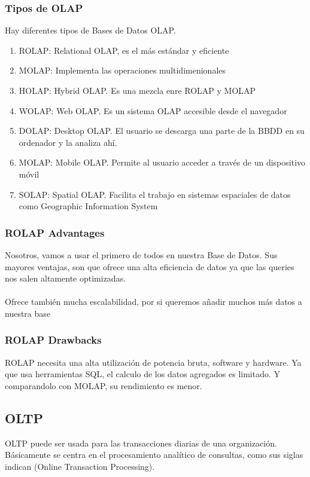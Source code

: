 \documentclass[a4paper 
,twoside
]{article}
\begin{document}
    \subsubsection{Tipos de OLAP}
    Hay diferentes tipos de Bases de Datos OLAP.
    \begin{enumerate}
      \item ROLAP: Relational OLAP, es el más estándar y eficiente
      \item MOLAP: Implementa las operaciones multidimenionales
      \item HOLAP: Hybrid OLAP. Es una mezcla enre ROLAP y MOLAP
      \item WOLAP: Web OLAP. Es un sistema OLAP accesible desde el navegador
      \item DOLAP: Desktop OLAP. El usuario se descarga una parte de la BBDD en su ordenador y la analiza ahí.
      \item MOLAP: Mobile OLAP. Permite al usuario acceder a través de un dispositivo móvil
      \item SOLAP: Spatial OLAP. Facilita el trabajo en sistemas espaciales de datos como Geographic Information System
    \end{enumerate}

    \subsubsection{ROLAP Advantages}
    Nosotros, vamos a usar el primero de todos en nuestra Base de Datos. Sus mayores ventajas, son que ofrece una alta eficiencia de datos ya que las queries nos salen altamente optimizadas.
    \paragraph{}
    Ofrece también mucha escalabilidad, por si queremos añadir muchos más datos a nuestra base 

    \subsubsection{ROLAP Drawbacks}
    ROLAP necesita una alta utilización de potencia bruta, software y hardware. Ya que usa herramientas SQL, el calculo de los datos agregados es limitado. Y comparandolo con MOLAP, su rendimiento es menor.

  \subsection{OLTP}
  OLTP puede ser usada para las transacciones diarias de una organización. Básicamente se centra en el procesamiento analítico de consultas, como sus siglas indican (Online Transaction Processing).
\end{document}
